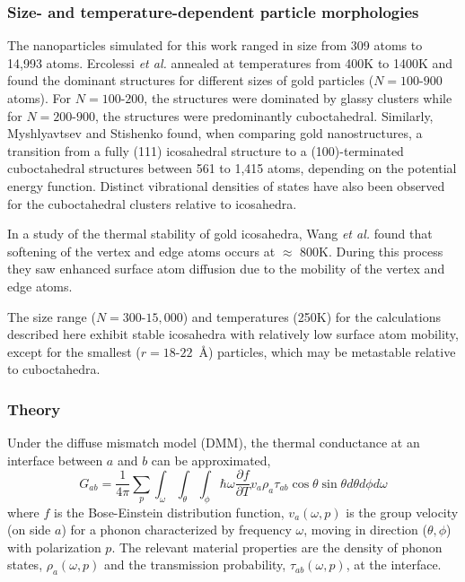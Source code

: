 \subsubsection{Size- and temperature-dependent particle morphologies}
The nanoparticles simulated for this work ranged in size from 309
atoms to 14,993 atoms.  Ercolessi \textit{et al.}\cite{Ercolessi1991}
annealed at temperatures from 400K to 1400K and found the dominant
structures for different sizes of gold particles
($N = 100 \text{-} 900$ atoms).  For $N = 100 \text{-} 200$, the
structures were dominated by glassy clusters while for
$N = 200 \text{-} 900$, the structures were predominantly
cuboctahedral. Similarly, Myshlyavtsev and Stishenko found, when
comparing gold nanostructures, a transition from a fully (111)
icosahedral structure to a (100)-terminated cuboctahedral structures
between 561 to 1,415 atoms, depending on the potential energy
function.\cite{Myshlyavtsev2013} Distinct vibrational densities of
states have also been observed for the cuboctahedral clusters relative
to icosahedra.\cite{Sauceda2015}

In a study of the thermal stability of gold icosahedra, Wang
\textit{et al.}\cite{Wang2004} found that softening of the vertex and
edge atoms occurs at $\approx$ 800K.  During this process they saw
enhanced surface atom diffusion due to the mobility of the vertex and
edge atoms.

The size range ($N = 300 \text{-} 15,000$) and temperatures (250K) for
the calculations described here exhibit stable icosahedra with
relatively low surface atom mobility, except for the smallest
($r = 18 \text{-} 22$~\AA) particles, which may be metastable relative to
cuboctahedra.

\subsubsection{Theory}
Under the diffuse mismatch model (DMM), the thermal conductance at an interface between $a$ and $b$ can be approximated,  
\begin{equation}
G_{ab} = \frac{1}{4 \pi} \sum_p \int_\omega \int_\theta \int_\phi \hbar \omega \frac{\partial f}{\partial T}  v_a  \rho_a  \tau_{ab} \cos\theta \sin\theta d\theta d\phi d\omega
\end{equation}
where $f$ is the Bose-Einstein distribution function, $v_a(\omega, p)$
is the group velocity (on side $a$) for a phonon characterized by
frequency $\omega$, moving in direction ($\theta, \phi$) with
polarization $p$.  The relevant material properties are the density of
phonon states, $\rho_a(\omega, p)$ and the transmission probability,
$\tau_{ab}(\omega, p)$, at the
interface.\cite{Swartz:1989uq,Reddy:2005fk,Monachon2016}

